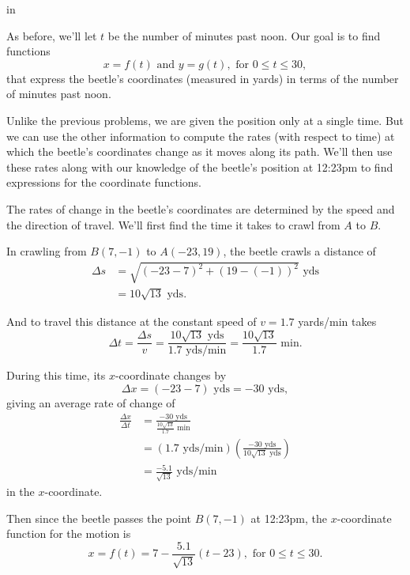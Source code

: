 \documentclass{ximera}
\newcommand{\pskip}{\vskip 0.1 in}
\begin{document}
\pskip

 As before, we'll let $t$ be the number of minutes past noon. Our goal is to find functions
\[
   x = f(t) \text{ and } y = g(t), \text{ for } 0\leq t \leq 30 ,
\]
that express the beetle's coordinates (measured in yards) in terms of the number of minutes past noon.

Unlike the previous problems, we are given the position only at a single time. But we can use the other information to compute the rates (with respect to time) at which the beetle's coordinates change as it moves along its path. We'll then use these rates along with our knowledge of the beetle's position at 12:23pm to find expressions for the coordinate functions. 

The rates of change in the beetle's coordinates are determined by the speed and the direction of travel. We'll first find the time it takes to crawl from $A$ to $B$. 

In crawling from $B(7,-1)$ to $A(-23,19)$, the beetle crawls a distance of
\begin{align*}
  \Delta s  &= \sqrt{(-23 - 7)^2 +   (19 - (-1))^2}  \text{ yds} \\
      & = 10\sqrt{13} \text { yds} .
\end{align*}

And to travel this distance at the constant speed of $v = 1.7$ yards/min takes
\[
       \Delta t = \frac{\Delta s}{v}   = \frac{10 \sqrt{13} \text { yds}}{1.7 \text{ yds/min}} = \frac{10 \sqrt{13}}{1.7 } \text{ min} .
\]

During this time, its $x$-coordinate changes by
\[
   \Delta x = (-23 - 7) \text{ yds} = -30 \text{ yds} ,
\]
giving an average rate of change of
\begin{align*}
  \frac{\Delta x}{\Delta t} &= \frac{-30 \text{ yds}}{\frac{10 \sqrt{13}}{1.7} \text{ min}}  \\
                                     & = \left( 1.7 \text{ yds/min} \right) \left( \frac{-30 \text{ yds}}{10\sqrt{13} \text{ yds}} \right) \label{Eq:RateofChange} \\
                                     & = \frac{-5.1}{\sqrt{13}} \text{ yds/min}  
\end{align*}
in the $x$-coordinate. 

Then since the beetle passes the point $B(7,-1)$ at 12:23pm,  the $x$-coordinate function for the motion is
\[
     x = f(t) = 7 - \frac{5.1}{\sqrt{13}}\left( t-23 \right) , \text{ for } 0\leq t \leq 30 .
\]
\end{document}
